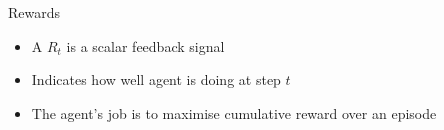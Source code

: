 \bgroup
\begin{frame}{Rewards}
\begin{itemize}
\item A  $R_t$ is a scalar feedback signal
\item Indicates how well agent is doing at step $t$
\item The agent's job is to maximise cumulative reward over an episode
\end{itemize}
\end{frame}
\egroup